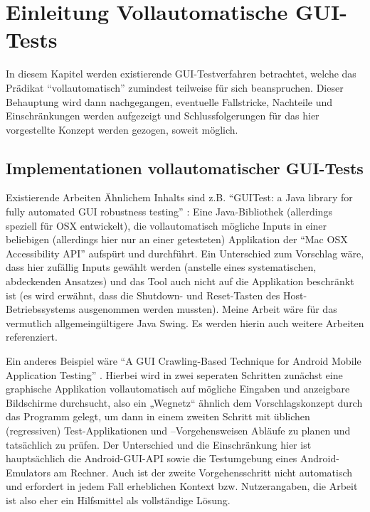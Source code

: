 \chapter{Einleitung Vollautomatische GUI-Tests}\label{chapter:introfullautoguitesting}


In diesem Kapitel werden existierende GUI-Testverfahren betrachtet, welche das Prädikat
``vollautomatisch'' zumindest teilweise für sich beanspruchen. Dieser Behauptung wird
dann nachgegangen, eventuelle Fallstricke, Nachteile und Einschränkungen werden aufgezeigt
und Schlussfolgerungen für das hier vorgestellte Konzept werden gezogen, soweit möglich.


\section{Implementationen vollautomatischer GUI-Tests}\label{section:fullautoguitestsimpl}


Existierende Arbeiten Ähnlichem Inhalts sind z.B. ``GUITest: a Java library for fully automated
GUI robustness testing'' \cite{GUITestBauersfeld}: Eine Java-Bibliothek 
(allerdings speziell für OSX entwickelt), die
vollautomatisch mögliche Inputs in einer beliebigen (allerdings hier nur an einer getesteten)
Applikation der ``Mac OSX Accessibility API'' aufspürt und durchführt. Ein Unterschied zum
Vorschlag wäre, dass hier zufällig Inputs gewählt werden (anstelle eines systematischen,
abdeckenden Ansatzes) und das Tool auch nicht auf die Applikation beschränkt ist (es wird
erwähnt, dass die Shutdown- und Reset-Tasten des Host-Betriebssystems ausgenommen werden
mussten). Meine Arbeit wäre für das vermutlich allgemeingültigere Java Swing. Es werden
hierin auch weitere Arbeiten referenziert. 
 
Ein anderes Beispiel wäre ``A GUI Crawling-Based Technique for Android Mobile Application
Testing'' \cite{AGCBTFAMAT}. Hierbei wird in zwei seperaten Schritten zunächst eine graphische Applikation
vollautomatisch auf mögliche Eingaben und anzeigbare Bildschirme durchsucht, also ein
„Wegnetz“ ähnlich dem Vorschlagskonzept durch das Programm gelegt, um dann in einem zweiten
Schritt mit üblichen (regressiven) Test-Applikationen und –Vorgehensweisen Abläufe zu
planen und tatsächlich zu prüfen. Der Unterschied und die Einschränkung hier ist
hauptsächlich die Android-GUI-API sowie die Testumgebung eines Android-Emulators am
Rechner. Auch ist der zweite Vorgehensschritt nicht automatisch und erfordert in jedem Fall
erheblichen Kontext bzw. Nutzerangaben, die Arbeit ist also eher ein Hilfsmittel als vollständige Lösung.